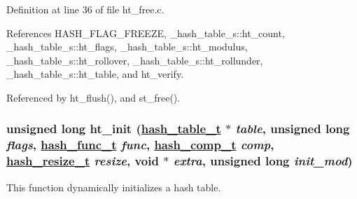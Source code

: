 Definition at line 36 of file ht\_\-free.c.

References HASH\_\-FLAG\_\-FREEZE, \_\-hash\_\-table\_\-s::ht\_\-count, \_\-hash\_\-table\_\-s::ht\_\-flags, \_\-hash\_\-table\_\-s::ht\_\-modulus, \_\-hash\_\-table\_\-s::ht\_\-rollover, \_\-hash\_\-table\_\-s::ht\_\-rollunder, \_\-hash\_\-table\_\-s::ht\_\-table, and ht\_\-verify.

Referenced by ht\_\-flush(), and st\_\-free().\hypertarget{group__dbprim__hash_ga10}{
\subsubsection[ht\_\-init]{\setlength{\rightskip}{0pt plus 5cm}unsigned long ht\_\-init (\hyperlink{struct__hash__table__s}{hash\_\-table\_\-t} $\ast$ {\em table}, unsigned long {\em flags}, \hyperlink{group__dbprim__hash_ga4}{hash\_\-func\_\-t} {\em func}, \hyperlink{group__dbprim__hash_ga5}{hash\_\-comp\_\-t} {\em comp}, \hyperlink{group__dbprim__hash_ga6}{hash\_\-resize\_\-t} {\em resize}, void $\ast$ {\em extra}, unsigned long {\em init\_\-mod})}}
\label{group__dbprim__hash_ga10}


This function dynamically initializes a hash table.

